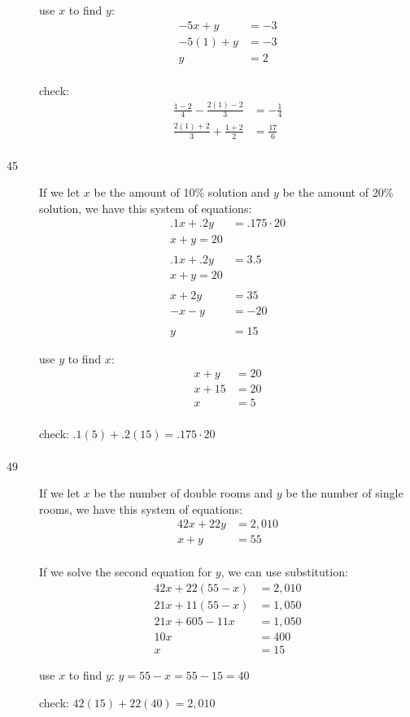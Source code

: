 \documentclass[fleqn,addpoints]{exam}
\begin{document}
\begin{description}
use $x$ to find $y$:
\begin{align*}
  -5x + y &= -3 \\
  -5(1) + y &= -3 \\
  y &= 2 \\
\end{align*}

\vspace{0.2 cm}
\vspace{0.2 cm}

check:
\begin{align*}
  \frac{1-2}{4} - \frac{2(1)-2}{3} &= -\frac{1}{4} \\
  \frac{2(1)+2}{3} + \frac{1+2}{2} &= \frac{17}{6} \\
\end{align*}

\item[45]
If we let $x$ be the amount of 10\% solution and $y$ be the amount of 20\% solution, we have this system of equations:
\begin{align*}
  .1x + .2y &= .175 \cdot 20 \\
  x + y = 20 \\
  \\
  .1x + .2y &= 3.5 \\
  x + y = 20 \\
  \\
  x + 2y &= 35 \\
  -x - y &= -20 \\
  \\
  y &= 15
\end{align*}

use $y$ to find $x$:
\begin{align*}
  x + y &= 20 \\
  x + 15 &= 20 \\
  x &= 5 \\
\end{align*}

check: $.1(5) + .2(15) = .175 \cdot 20$
\begin{align*}
\end{align*}

\item[49]
If we let $x$ be the number of double rooms and $y$ be the number of single rooms, we have this system of equations:
\begin{align*}
  42x + 22y &= 2,010 \\
  x + y &= 55 \\
\end{align*}

If we solve the second equation for $y$, we can use substitution:
\begin{align*}
  42x + 22(55-x) &= 2,010 \\
  21x + 11(55-x) &= 1,050 \\
  21x + 605 - 11x &= 1,050 \\
  10x &= 400 \\
  x &= 15
\end{align*}

use $x$ to find $y$: $y = 55-x = 55-15 = 40$

check: $42(15) + 22(40) = 2,010$

\end{description}
\end{document}
